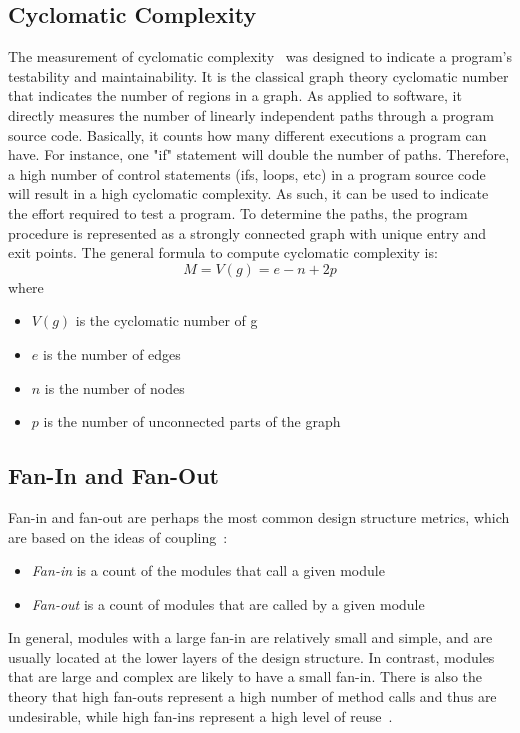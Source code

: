 \subsection{Cyclomatic Complexity}
The measurement of cyclomatic complexity~\cite{mccabe1976complexity} was designed to indicate a program's testability and maintainability.
It is the classical graph theory cyclomatic number that indicates the number of regions in a graph.
As applied to software, it directly measures the number of linearly independent paths through a program source code.
Basically, it counts how many different executions a program can have. 
For instance, one "if" statement will double the number of paths. 
Therefore, a high number of control statements (ifs, loops, etc) in a program source code will result in a high cyclomatic complexity. 
As such, it can be used to indicate the effort required to test a program. To determine the paths, the program procedure is represented as a strongly connected graph with unique entry and exit points. The general formula to compute cyclomatic complexity is: 
$$M = V(g) = e - n + 2p$$
where
\begin{itemize}
\item \emph{$V(g)$} is the cyclomatic number of g 
\item \emph{$e$   } is the number of edges 
\item \emph{$n$   } is the number of nodes 
\item \emph{$p$   } is the number of unconnected parts of the graph 
\end{itemize}


\subsection{Fan-In and Fan-Out}
Fan-in and fan-out are perhaps the most common design structure metrics, which are based on the ideas of coupling~\cite{yourdon1979structured}:
\begin{itemize}
\item \emph{Fan-in } is a count of the modules that call a given module
\item \emph{Fan-out} is a count of modules that are called by a given module
\end{itemize}

In general, modules with a large fan-in are relatively small and simple, and are usually located at the lower layers of the design structure.
In contrast, modules that are large and complex are likely to have a small fan-in.
There is also the theory that high fan-outs represent a high number of method calls and thus are undesirable,
while high fan-ins represent a high level of reuse~\cite{wang2007dynamic}.

